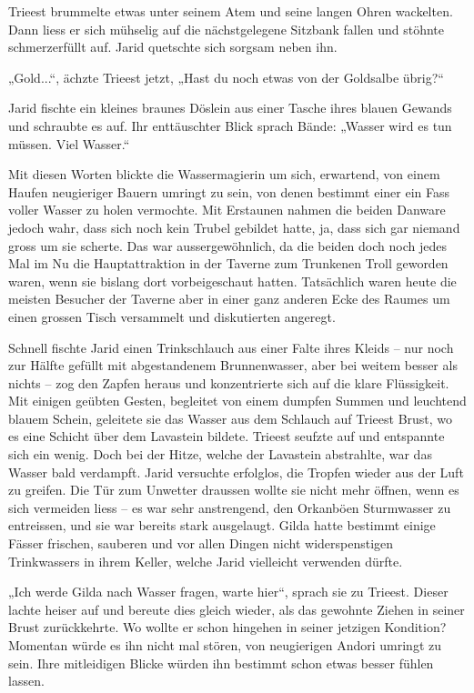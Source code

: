 Trieest brummelte etwas unter seinem Atem und seine langen Ohren wackelten. Dann liess er sich mühselig auf die nächstgelegene Sitzbank fallen und stöhnte schmerzerfüllt auf. Jarid quetschte sich sorgsam neben ihn.

„Gold...“, ächzte Trieest jetzt, „Hast du noch etwas von der Goldsalbe übrig?“

Jarid fischte ein kleines braunes Döslein aus einer Tasche ihres blauen Gewands und schraubte es auf. Ihr enttäuschter Blick sprach Bände: „Wasser wird es tun müssen. Viel Wasser.“

Mit diesen Worten blickte die Wassermagierin um sich, erwartend, von einem Haufen neugieriger Bauern umringt zu sein, von denen bestimmt einer ein Fass voller Wasser zu holen vermochte. Mit Erstaunen nahmen die beiden Danware jedoch wahr, dass sich noch kein Trubel gebildet hatte, ja, dass sich gar niemand gross um sie scherte. Das war aussergewöhnlich, da die beiden doch noch jedes Mal im Nu die Hauptattraktion in der Taverne zum Trunkenen Troll geworden waren, wenn sie bislang dort vorbeigeschaut hatten. Tatsächlich waren heute die meisten Besucher der Taverne aber in einer ganz anderen Ecke des Raumes um einen grossen Tisch versammelt und diskutierten angeregt.

Schnell fischte Jarid einen Trinkschlauch aus einer Falte ihres Kleids – nur noch zur Hälfte gefüllt mit abgestandenem Brunnenwasser, aber bei weitem besser als nichts – zog den Zapfen heraus und konzentrierte sich auf die klare Flüssigkeit. Mit einigen geübten Gesten, begleitet von einem dumpfen Summen und leuchtend blauem Schein, geleitete sie das Wasser aus dem Schlauch auf Trieest Brust, wo es eine Schicht über dem Lavastein bildete. Trieest seufzte auf und entspannte sich ein wenig. Doch bei der Hitze, welche der Lavastein abstrahlte, war das Wasser bald verdampft. Jarid versuchte erfolglos, die Tropfen wieder aus der Luft zu greifen. Die Tür zum Unwetter draussen wollte sie nicht mehr öffnen, wenn es sich vermeiden liess – es war sehr anstrengend, den Orkanböen Sturmwasser zu entreissen, und sie war bereits stark ausgelaugt. Gilda hatte bestimmt einige Fässer frischen, sauberen und vor allen Dingen nicht widerspenstigen Trinkwassers in ihrem Keller, welche Jarid vielleicht verwenden dürfte.

„Ich werde Gilda nach Wasser fragen, warte hier“, sprach sie zu Trieest. Dieser lachte heiser auf und bereute dies gleich wieder, als das gewohnte Ziehen in seiner Brust zurückkehrte. Wo wollte er schon hingehen in seiner jetzigen Kondition? Momentan würde es ihn nicht mal stören, von neugierigen Andori umringt zu sein. Ihre mitleidigen Blicke würden ihn bestimmt schon etwas besser fühlen lassen.



